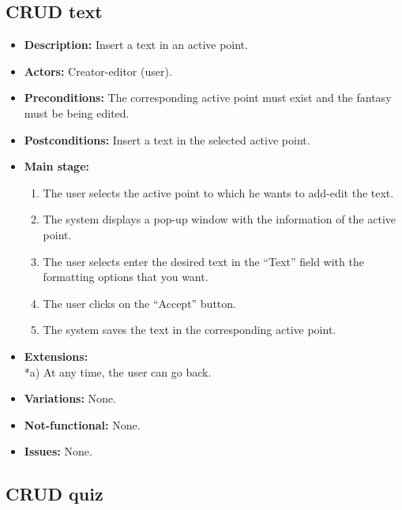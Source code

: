 \subsection{CRUD text}
\begin{itemize}
	\item \textbf{Description:} Insert a text in an active point.
	\item \textbf{Actors:} Creator-editor (user).
	\item \textbf{Preconditions:} The corresponding active point must exist and the fantasy must be being edited.
	\item \textbf{Postconditions:} Insert a text in the selected active point.
	\item \textbf{Main stage:}
	\begin{enumerate}
		\item The user selects the active point to which he wants to add-edit the text.
		\item The system displays a pop-up window with the information of the active point.
		\item The user selects enter the desired text in the ``Text'' field with the formatting options that you want.
		\item The user clicks on the ``Accept'' button.
		\item The system saves the text in the corresponding active point.
	\end{enumerate}
	\item \textbf{Extensions:} \\ *a) At any time, the user can go back.
	\item \textbf{Variations:} None.
	\item \textbf{Not-functional:} None.
	\item \textbf{Issues:} None.
\end{itemize}

\subsection{CRUD quiz}
\hypertarget{crearquiz}{}
